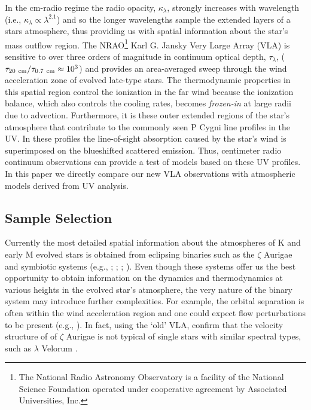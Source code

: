 \documentclass[iop]{emulateapj}
\begin{document}
In the cm-radio regime the radio opacity, $ \kappa _{\lambda}$, strongly increases with wavelength (i.e., $ \kappa _{\lambda} \propto \lambda ^{2.1}$) and so the longer wavelengths sample the extended layers of a stars atmosphere, thus	 providing us with spatial information about the star's mass outflow region. The NRAO\footnote{The National Radio Astronomy Observatory is a facility of the National Science Foundation operated under cooperative agreement by Associated Universities, Inc.} Karl G. Jansky Very Large Array (VLA) is sensitive to over three orders of magnitude in continuum optical depth, $\tau _{\lambda}$, ($\tau _{20 \ \rm{cm}}/\tau _{0.7 \ \rm{cm}} \approx 10^3$) and provides an area-averaged sweep through the wind acceleration zone of evolved late-type stars. The thermodynamic properties in this spatial region control the ionization in the far wind because the ionization balance, which also controls the cooling rates, becomes \textit{frozen-in} at large radii due to advection. Furthermore, it is these outer extended regions of the star's atmosphere that contribute to the commonly seen P Cygni line profiles in the UV. In these profiles the line-of-sight absorption caused by the star's wind is superimposed on the blueshifted scattered emission. Thus, centimeter radio continuum observations can provide a test of models based on these UV profiles. In this paper we directly compare our new VLA observations with atmospheric models derived from UV analysis.

\subsection{Sample Selection} \label{intro2}

Currently the most detailed spatial information about the atmospheres of K and early M evolved stars is obtained from eclipsing binaries such as the $\zeta$ Aurigae and symbiotic systems (e.g., \citealt{1970VA.....12..147W}; \citealt{1996ApJ...466..979B}; \citealt{2008AJ....136.1964E}; \citealt{2008ApJ...675..711C}). Even though these systems offer us the best opportunity to obtain information on the dynamics and thermodynamics at various heights in the evolved star's atmosphere, the very nature of the binary system may introduce further complexities. For example, the orbital separation is often within the wind acceleration region and one could expect flow perturbations to be present (e.g., \citealt{1981ApJ...248.1043C}). In fact, using the `old' VLA, \cite{2005AJ....129.1018H} confirm that the velocity structure of  of $\zeta$ Aurigae is not typical of single stars with similar spectral types, such as $\lambda$ Velorum \citep{1999ApJ...521..382C}. 
\end{document}
